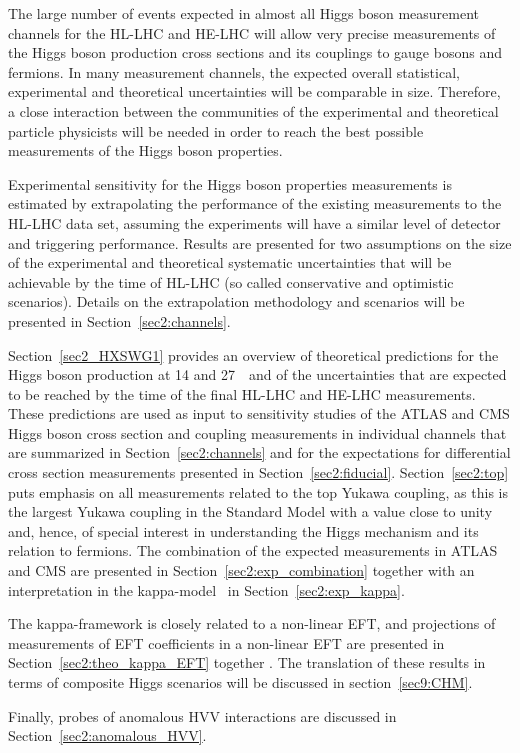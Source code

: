

The large number of events expected in almost all Higgs boson measurement channels for the HL-LHC and HE-LHC will allow very precise measurements of the Higgs boson production cross sections and its couplings to gauge bosons and fermions. In many measurement channels, the expected overall statistical, experimental and theoretical uncertainties will be comparable in size. Therefore, a close interaction between the communities of the experimental and theoretical particle physicists will be needed in order to reach the best possible measurements of the Higgs boson properties.

Experimental sensitivity for the Higgs boson properties measurements is estimated by extrapolating the performance of the existing measurements to the HL-LHC data set, assuming the experiments will have a similar level of detector and triggering performance. Results are presented for two assumptions on the size of the experimental and theoretical systematic uncertainties that will be achievable by the time of HL-LHC (so called conservative and optimistic scenarios). Details on the extrapolation methodology and scenarios will be presented in Section~\ref{sec2:channels}.

Section~\ref{sec2_HXSWG1} provides an overview of theoretical predictions for the Higgs boson production at 14 and 27~\UTeV\ and of the uncertainties that are expected to be reached by the time of the final HL-LHC and HE-LHC measurements. 
These predictions are used as input to sensitivity studies of the ATLAS and CMS Higgs boson cross section and coupling measurements in individual channels that are summarized in Section~\ref{sec2:channels} and for the expectations for differential cross section measurements presented in Section~\ref{sec2:fiducial}.
Section~\ref{sec2:top} puts emphasis on all measurements related to the top Yukawa coupling, as this is the largest Yukawa coupling in the Standard Model with a value close to unity and, hence, of special interest in understanding the Higgs mechanism and its relation to fermions.
The combination of the expected measurements in ATLAS and CMS are presented in Section~\ref{sec2:exp_combination} together with an interpretation in the kappa-model~\cite{LHCHiggsCrossSectionWorkingGroup:2012nn,Heinemeyer:2013tqa} in Section~\ref{sec2:exp_kappa}.

The kappa-framework is closely related to a non-linear EFT, and projections of measurements of EFT coefficients in a non-linear EFT are presented in Section~\ref{sec2:theo_kappa_EFT} together .
The translation of these results in terms of composite Higgs scenarios will be discussed in section~\ref{sec9:CHM}.

Finally, probes of anomalous HVV interactions are discussed in Section~\ref{sec2:anomalous_HVV}.
